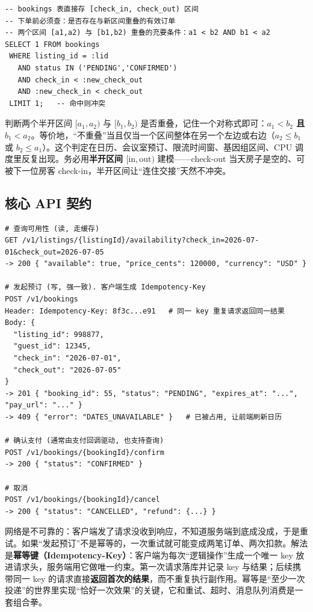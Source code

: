 \begin{lstlisting}
-- bookings 表直接存 [check_in, check_out) 区间
-- 下单前必须查：是否存在与新区间重叠的有效订单
-- 两个区间 [a1,a2) 与 [b1,b2) 重叠的充要条件：a1 < b2 AND b1 < a2
SELECT 1 FROM bookings
 WHERE listing_id = :lid
   AND status IN ('PENDING','CONFIRMED')
   AND check_in < :new_check_out
   AND :new_check_in < check_out
 LIMIT 1;   -- 命中则冲突
\end{lstlisting}

\begin{idea}[区间重叠判定是可迁移的基本功]
判断两个半开区间 $[a_1, a_2)$ 与 $[b_1, b_2)$ 是否重叠，记住一个对称式即可：\textbf{$a_1 < b_2$ 且 $b_1 < a_2$}。等价地，“不重叠”当且仅当一个区间整体在另一个左边或右边（$a_2 \le b_1$ 或 $b_2 \le a_1$）。这个判定在日历、会议室预订、限流时间窗、基因组区间、CPU 调度里反复出现。务必用\textbf{半开区间 $[\text{in}, \text{out})$} 建模——check-out 当天房子是空的、可被下一位房客 check-in，半开区间让“连住交接”天然不冲突。
\end{idea}

\subsection{核心 API 契约}

\begin{lstlisting}
# 查询可用性 (读, 走缓存)
GET /v1/listings/{listingId}/availability?check_in=2026-07-01&check_out=2026-07-05
-> 200 { "available": true, "price_cents": 120000, "currency": "USD" }

# 发起预订 (写, 强一致). 客户端生成 Idempotency-Key
POST /v1/bookings
Header: Idempotency-Key: 8f3c...e91   # 同一 key 重复请求返回同一结果
Body: {
  "listing_id": 998877,
  "guest_id": 12345,
  "check_in": "2026-07-01",
  "check_out": "2026-07-05"
}
-> 201 { "booking_id": 55, "status": "PENDING", "expires_at": "...", "pay_url": "..." }
-> 409 { "error": "DATES_UNAVAILABLE" }   # 已被占用, 让前端刷新日历

# 确认支付 (通常由支付回调驱动, 也支持查询)
POST /v1/bookings/{bookingId}/confirm
-> 200 { "status": "CONFIRMED" }

# 取消
POST /v1/bookings/{bookingId}/cancel
-> 200 { "status": "CANCELLED", "refund": {...} }
\end{lstlisting}

\begin{idea}
网络是不可靠的：客户端发了请求没收到响应，不知道服务端到底成没成，于是重试。如果“发起预订”不是幂等的，一次重试就可能变成两笔订单、两次扣款。解法是\textbf{幂等键（Idempotency-Key）}：客户端为每次“逻辑操作”生成一个唯一 key 放进请求头，服务端用它做唯一约束。第一次请求落库并记录 key 与结果；后续携带同一 key 的请求直接\textbf{返回首次的结果}，而不重复执行副作用。幂等是“至少一次投递”的世界里实现“恰好一次效果”的关键，它和重试、超时、消息队列消费是一套组合拳。
\end{idea}

